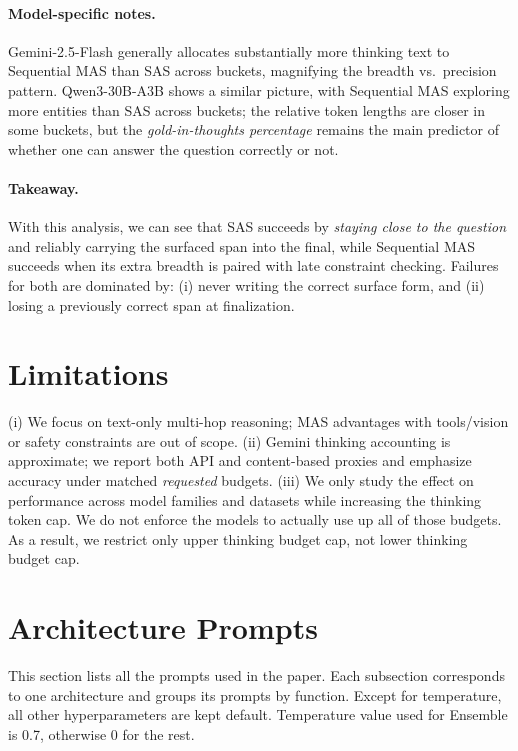 \documentclass{article} %
\begin{document}
\paragraph{Model-specific notes.}
Gemini-2.5-Flash generally allocates substantially more thinking text to Sequential MAS than SAS across buckets, magnifying the breadth vs.\ precision pattern.
Qwen3-30B-A3B shows a similar picture, with Sequential MAS exploring more entities than SAS across buckets; the relative token lengths are closer in some buckets, but the \emph{gold-in-thoughts percentage} remains the main predictor of whether one can answer the question correctly or not.

\paragraph{Takeaway.}
With this analysis, we can see that SAS succeeds by \emph{staying close to the question} and reliably carrying the surfaced span into the final, while Sequential MAS succeeds when its extra breadth is paired with late constraint checking. Failures for both are dominated by: (i) never writing the correct surface form, and (ii) losing a previously correct span at finalization.

\section{Limitations}
\label{sec:limitations}
(i) We focus on text-only multi-hop reasoning; MAS advantages with tools/vision or safety constraints are out of scope. (ii) Gemini thinking accounting is approximate; we report both API and content-based proxies and emphasize accuracy under matched \emph{requested} budgets. (iii) We only study the effect on performance across model families and datasets while increasing the thinking token cap. We do not enforce the models to actually use up all of those budgets. As a result, we restrict only upper thinking budget cap, not lower thinking budget cap.

\section{Architecture Prompts}
\label{appendix:architecture-prompts}

This section lists all the prompts used in the paper. Each subsection corresponds to one architecture and groups its prompts by function. Except for temperature, all other hyperparameters are kept default. Temperature value used for Ensemble is 0.7, otherwise 0 for the rest.
\end{document}
